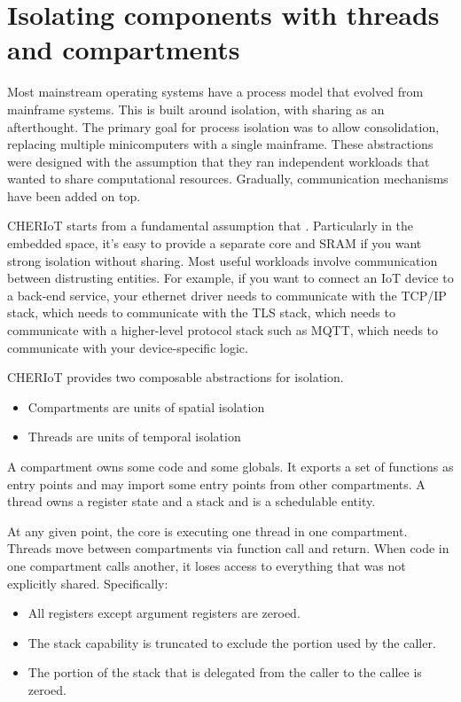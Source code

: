 \section{Isolating components with threads and compartments}

Most mainstream operating systems have a process model that evolved from mainframe systems.
This is built around isolation, with sharing as an afterthought.
The primary goal for process isolation was to allow consolidation, replacing multiple minicomputers with a single mainframe.
These abstractions were designed with the assumption that they ran independent workloads that wanted to share computational resources.
Gradually, communication mechanisms have been added on top.

CHERIoT starts from a fundamental assumption that .
Particularly in the embedded space, it's easy to provide a separate core and SRAM if you want strong isolation without sharing.
Most useful workloads involve communication between distrusting entities.
For example, if you want to connect an IoT device to a back-end service, your ethernet driver needs to communicate with the TCP/IP stack, which needs to communicate with the TLS stack, which needs to communicate with a higher-level protocol stack such as MQTT, which needs to communicate with your device-specific logic.

CHERIoT provides two composable abstractions for isolation.

\begin{itemize}
	\item{Compartments are units of spatial isolation}
	\item{Threads are units of temporal isolation}
\end{itemize}

A compartment owns some code and some globals.
It exports a set of functions as entry points and may import some entry points from other compartments.
A thread owns a register state and a stack and is a schedulable entity.

At any given point, the core is executing one thread in one compartment.
Threads move between compartments via function call and return.
When code in one compartment calls another, it loses access to everything that was not explicitly shared.
Specifically:

\begin{itemize}
	\item{All registers except argument registers are zeroed.}
	\item{The stack capability is truncated to exclude the portion used by the caller.}
	\item{The portion of the stack that is delegated from the caller to the callee is zeroed.}
\end{itemize}

